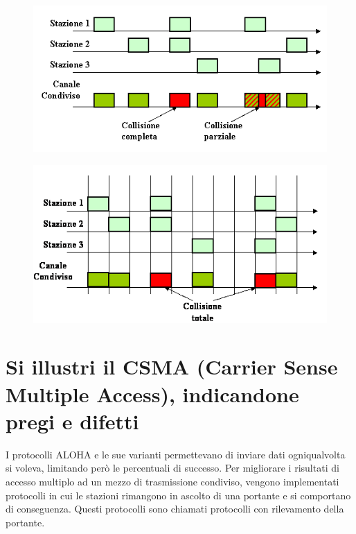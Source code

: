 \begin{figure}[H]
\centering
\includegraphics[scale=0.7]{res/img/22_ALOHA.png}
\end{figure}
\begin{figure}[H]
\centering
\includegraphics[scale=0.7]{res/img/22_ALOHASLOTTED.png}
\end{figure}

\section{Si illustri il CSMA (Carrier Sense Multiple Access), indicandone pregi e difetti}

I protocolli ALOHA e le sue varianti permettevano di inviare dati ogniqualvolta si voleva, limitando però le percentuali di successo.
Per migliorare i risultati di accesso multiplo ad un mezzo di trasmissione condiviso, vengono implementati protocolli in cui le stazioni rimangono in ascolto di una portante e si comportano di conseguenza. Questi protocolli sono chiamati protocolli con rilevamento della portante.
